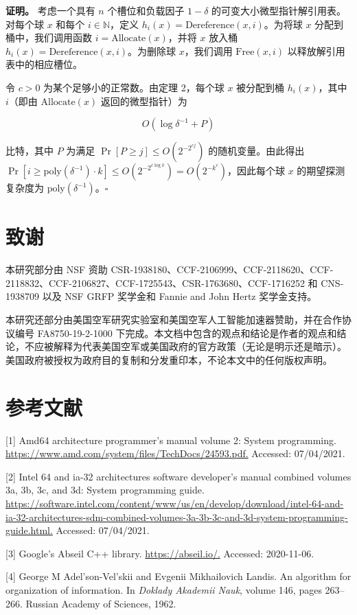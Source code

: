 \documentclass[12pt,a4paper]{ctexart}
\theoremstyle{remark}
\begin{document}
\textbf{证明。} 考虑一个具有 $n$ 个槽位和负载因子 $1-\delta$ 的可变大小微型指针解引用表。对每个球 $x$ 和每个 $i\in\mathbb{N}$，定义 $h_i(x)=\text{Dereference}(x,i)$。为将球 $x$ 分配到桶中，我们调用函数 $i=\text{Allocate}(x)$，并将 $x$ 放入桶 $h_i(x)=\text{Dereference}(x,i)$。为删除球 $x$，我们调用 $\text{Free}(x,i)$ 以释放解引用表中的相应槽位。

令 $c>0$ 为某个足够小的正常数。由定理 2，每个球 $x$ 被分配到桶 $h_i(x)$，其中 $i$（即由 $\text{Allocate}(x)$ 返回的微型指针）为

$$O(\log\delta^{-1}+P)$$

比特，其中 $P$ 为满足 $\Pr[P\geq j]\leq O(2^{-2^{cj}})$ 的随机变量。由此得出 $\Pr[i\geq\text{poly}(\delta^{-1})\cdot k]\leq O(2^{-2^{c\log k}})=O(2^{-k^c})$，因此每个球 $x$ 的期望探测复杂度为 $\text{poly}(\delta^{-1})$。$\square$

\medskip
\section{致谢}
本研究部分由 NSF 资助 CSR-1938180、CCF-2106999、CCF-2118620、CCF-2118832、CCF-2106827、CCF-1725543、CSR-1763680、CCF-1716252 和 CNS-1938709 以及 NSF GRFP 奖学金和 Fannie and John Hertz 奖学金支持。

本研究还部分由美国空军研究实验室和美国空军人工智能加速器赞助，并在合作协议编号 FA8750-19-2-1000 下完成。本文档中包含的观点和结论是作者的观点和结论，不应被解释为代表美国空军或美国政府的官方政策（无论是明示还是暗示）。美国政府被授权为政府目的复制和分发重印本，不论本文中的任何版权声明。

\medskip
\section{参考文献}
[1] Amd64 architecture programmer's manual volume 2: System programming. \url{https://www.amd.com/system/files/TechDocs/24593.pdf.} Accessed: 07/04/2021.

[2] Intel 64 and ia-32 architectures software developer's manual combined volumes 3a, 3b, 3c, and 3d: System programming guide. \url{https://software.intel.com/content/www/us/en/develop/download/intel-64-and-ia-32-architectures-sdm-combined-volumes-3a-3b-3c-and-3d-system-programming-guide.html.} Accessed: 07/04/2021.

[3] Google's Abseil C++ library. \url{https://abseil.io/.} Accessed: 2020-11-06.

[4] George M Adel'son-Vel'skii and Evgenii Mikhailovich Landis. An algorithm for organization of information. In \textit{Doklady Akademii Nauk}, volume 146, pages 263--266. Russian Academy of Sciences, 1962.
\end{document}
